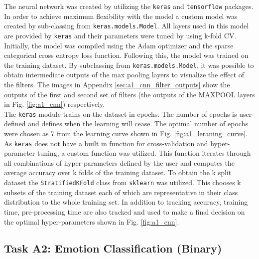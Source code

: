 \documentclass{article}
\begin{document}
    	The neural network was created by utilizing the {\tt keras} and {\tt tensorflow} packages. In order to achieve maximum flexibility with the model a custom model was created by sub-classing from {\tt keras.models.Model}. All layers used in this model are provided by {\tt keras} and their parameters were tuned by using k-fold CV. Initially, the model was compiled using the Adam optimizer and the sparse categorical cross entropy loss function. Following this, the model was trained on the training dataset. By subclassing from {\tt keras.models.Model}, it was possible to obtain intermediate outputs of the max pooling layers to visualize the effect of the filters. The images in Appendix \ref{sec:a1_cnn_filter_outputs} show the outputs of the first and second set of filters (the outputs of the MAXPOOL layers in Fig. \ref{fig:a1_cnn}) respectively. 
    	\\
    	
    	The {\tt keras} module trains on the dataset in epochs. The number of epochs is user-defined and defines when the learning will cease. The optimal number of epochs were chosen as 7 from the learning curve shown in Fig. \ref{fig:a1_leraning_curve}.
    	\\
    	
    	As {\tt keras} does not have a built in function for cross-validation and hyper-parameter tuning, a custom function was utilized. This function iterates through all combinations of hyper-parameters defined by the user and computes the average accuracy over k folds of the training dataset. To obtain the k split dataset the {\tt StratifiedKFold} class from {\tt sklearn} was utilized. This chooses k subsets of the training dataset each of which are representative in their class distribution to the whole training set. In addition to tracking accuracy, training time, pre-processing time are also tracked and used to make a final decision on the optimal hyper-parameters shown in Fig. \ref{fig:a1_cnn}.
    	
    \subsection{Task A2: Emotion Classification (Binary)}
 	\label{sec:implement_A2}
 	
\end{document}
